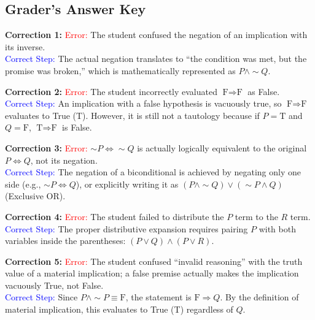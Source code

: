 \documentclass{article}
\begin{document}
\subsection*{Grader's Answer Key}

\textbf{Correction 1:} 
\textcolor{red}{Error:} The student confused the negation of an implication with its inverse. \\
\textcolor{blue}{Correct Step:} The actual negation translates to ``the condition was met, but the promise was broken,'' which is mathematically represented as $P \land \sim Q$.

\textbf{Correction 2:} 
\textcolor{red}{Error:} The student incorrectly evaluated $\text{F} \Rightarrow \text{F}$ as False. \\
\textcolor{blue}{Correct Step:} An implication with a false hypothesis is vacuously true, so $\text{F} \Rightarrow \text{F}$ evaluates to True (T). However, it is still not a tautology because if $P=\text{T}$ and $Q=\text{F}$, $\text{T} \Rightarrow \text{F}$ is False.

\textbf{Correction 3:} 
\textcolor{red}{Error:} $\sim P \Leftrightarrow \sim Q$ is actually logically equivalent to the original $P \Leftrightarrow Q$, not its negation. \\
\textcolor{blue}{Correct Step:} The negation of a biconditional is achieved by negating only one side (e.g., $\sim P \Leftrightarrow Q$), or explicitly writing it as $(P \land \sim Q) \lor (\sim P \land Q)$ (Exclusive OR).

\textbf{Correction 4:} 
\textcolor{red}{Error:} The student failed to distribute the $P$ term to the $R$ term. \\
\textcolor{blue}{Correct Step:} The proper distributive expansion requires pairing $P$ with both variables inside the parentheses: $(P \lor Q) \land (P \lor R)$.

\textbf{Correction 5:} 
\textcolor{red}{Error:} The student confused ``invalid reasoning'' with the truth value of a material implication; a false premise actually makes the implication vacuously True, not False. \\
\textcolor{blue}{Correct Step:} Since $P \land \sim P \equiv \text{F}$, the statement is $\text{F} \Rightarrow Q$. By the definition of material implication, this evaluates to True (T) regardless of $Q$.
\end{document}
